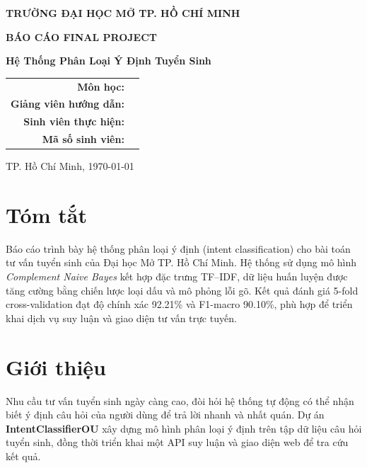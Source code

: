 \documentclass[12pt,a4paper]{article}
\begin{document}
\begin{titlepage}
    \centering
    \vspace*{2cm}
    {\Large \textbf{TRƯỜNG ĐẠI HỌC MỞ TP. HỒ CHÍ MINH}\par}
    \vspace{0.5cm}
    {\large \textbf{BÁO CÁO FINAL PROJECT}\par}
    \vspace{1.5cm}
    {\huge \textbf{Hệ Thống Phân Loại Ý Định Tuyển Sinh}\par}
    \vspace{1.5cm}
    \begin{tabular}{rl}
        \textbf{Môn học:} & \underline{\hspace{8cm}} \\
        \textbf{Giảng viên hướng dẫn:} & \underline{\hspace{7.2cm}} \\
        \textbf{Sinh viên thực hiện:} & \underline{\hspace{7.2cm}} \\
        \textbf{Mã số sinh viên:} & \underline{\hspace{7.2cm}} \\
    \end{tabular}
    \vfill
    {\large TP. Hồ Chí Minh, \today\par}
\end{titlepage}

\tableofcontents
\newpage

\section{Tóm tắt}
Báo cáo trình bày hệ thống phân loại ý định (intent classification) cho bài toán tư vấn tuyển sinh của
Đại học Mở TP. Hồ Chí Minh. Hệ thống sử dụng mô hình \textit{Complement Naive Bayes} kết hợp đặc trưng
TF--IDF, dữ liệu huấn luyện được tăng cường bằng chiến lược loại dấu và mô phỏng lỗi gõ. Kết quả đánh giá
5-fold cross-validation đạt độ chính xác 92.21\% và F1-macro 90.10\%, phù hợp để triển khai dịch vụ suy luận
và giao diện tư vấn trực tuyến.

\section{Giới thiệu}
Nhu cầu tư vấn tuyển sinh ngày càng cao, đòi hỏi hệ thống tự động có thể nhận biết ý định câu hỏi của người dùng
để trả lời nhanh và nhất quán. Dự án \textbf{IntentClassifierOU} xây dựng mô hình phân loại ý định trên
tập dữ liệu câu hỏi tuyển sinh, đồng thời triển khai một API suy luận và giao diện web để tra cứu kết quả.
\end{document}
